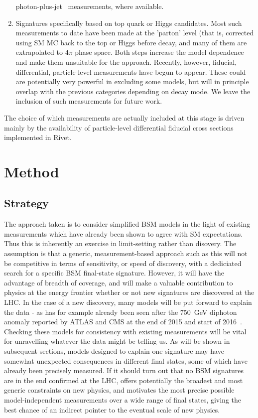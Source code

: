 \documentclass[floatfix]{article}
\begin{document}
\begin{enumerate}
photon-plus-jet~\cite{ATLAS:2012ar} measurements, where available.
\item
Signatures specifically based on top quark or Higgs candidates. Most such measurements to date have been made at the 'parton' level (that is,
corrected using SM MC back to the top or Higgs before decay, and many of them are extrapolated to $4\pi$ phase space. Both steps increase
the model dependence and make them unsuitable for the \Contur approach. Recently, however, fiducial, differential, particle-level measurements
have begun to appear\cite{Aad:2015hna,Khachatryan:2016gxp}. These could are potentially very powerful in excluding some models, but will in principle overlap with the previous 
categories depending on decay mode. We leave the inclusion of such measurements for future work.
\end{enumerate}

The choice of which measurements are actually included at this stage is driven mainly by the availability of particle-level differential 
fiducial cross sections 
implemented in Rivet.

\section{Method}

\subsection{Strategy}

The approach taken is to consider simplified BSM models in the light of existing measurements which have already been shown to agree with SM expectations.
Thus this is inherently an exercise in limit-setting rather than disovery. The assumption is that a generic, measurement-based approach such as this will not be
competitive in terms of sensitivity, or speed of discovery, with a dediciated search for a specific BSM final-state signature. However, it will have the
advantage of breadth of coverage, and will make a valuable contribution to physics at the energy frontier whether or not new signatures are discovered at the LHC.
In the case of a new discovery, many models will be put forward to explain the data - as has for example already been seen\cite{PhysRevLett.116.150001} 
after the 750~GeV diphoton anomaly 
reported by ATLAS and CMS at the end of 2015 and start of 2016~\cite{ATLAS-CONF-2016-018,CMS-PAS-EXO-16-018}. 
Checking these models for consistency with existing measurements will be vital for unravelling whatever 
the data might be telling us. As will be shown in subsequent sections, models designed to explain one signature may have somewhat unexpected consequences 
in different final states, some of which have already been precisely measured. If it should turn out that no BSM signatures are in the end confirmed at the LHC,
\Contur offers potentially the broadest and most generic constraints on new physics, and motivates the most precise possible model-independent measurements
over a wide range of final states, giving the best chance of an indirect pointer to the eventual scale of new physics.
\end{document}
